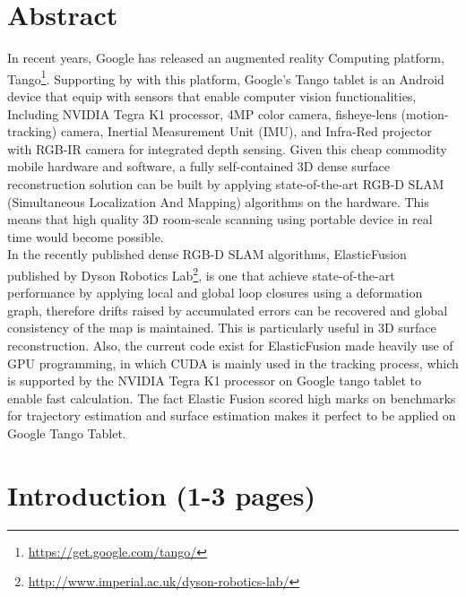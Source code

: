 \documentclass[12pt,twoside]{article}
\begin{document}





\section{Abstract}
In recent years, Google has released an augmented reality Computing platform, Tango\footnote{\url{https://get.google.com/tango/}}. Supporting by with this platform, Google's Tango tablet is an Android device that equip with sensors that enable computer vision functionalities, Including NVIDIA Tegra K1 processor, 4MP color camera, fisheye-lens (motion-tracking) camera, Inertial Measurement Unit (IMU), and Infra-Red projector with RGB-IR camera for integrated depth sensing. Given this cheap commodity mobile hardware and software, a fully self-contained 3D dense surface reconstruction solution can be built by applying state-of-the-art RGB-D SLAM (Simultaneous Localization And Mapping) algorithms on the hardware. This means that high quality 3D room-scale scanning using portable device in  real time would become possible.\\
In the recently published dense RGB-D SLAM algorithms, ElasticFusion\cite{whelan2015elasticfusion} published by Dyson Robotics Lab\footnote{\url{http://www.imperial.ac.uk/dyson-robotics-lab/}}, is one that achieve state-of-the-art performance by applying local and global loop closures using a deformation graph, therefore drifts raised by accumulated errors can be recovered and global consistency of the map is maintained. This is particularly useful in 3D surface reconstruction. Also, the current code exist for ElasticFusion made heavily use of GPU programming, in which CUDA is mainly used in the tracking process, which is supported by the NVIDIA Tegra K1 processor on Google tango tablet to enable fast calculation. The fact Elastic Fusion scored high marks on benchmarks for trajectory estimation and surface estimation makes it perfect to be applied on Google Tango Tablet.\\

\section{Introduction (1-3 pages)}
\end{document}
